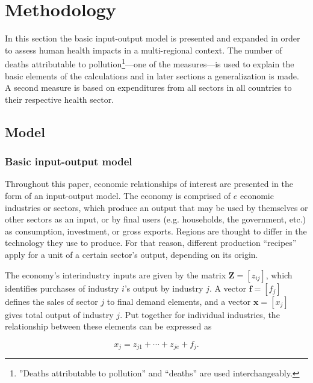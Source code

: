 \documentclass[a4paper,12pt]{article}
\begin{document}


\section{Methodology}
\label{sec:method}

In this section the basic input-output model is presented and expanded in order to assess human health impacts in a multi-regional context. The number of deaths attributable to pollution\footnote{''Deaths attributable to pollution'' and ``deaths'' are used interchangeably.}---one of the measures---is used to explain the basic elements of the calculations and in later sections a generalization is made. 
A second measure is based on expenditures from all sectors in all countries to their respective health sector.

\subsection{Model}
\subsubsection[]{Basic input-output model} 
\label{sec:basicio}

Throughout this paper, economic relationships of interest are presented in the form of an input-output model. The economy is comprised of $e$ economic industries or sectors, which produce an output that may be used by themselves or other sectors as an input, or by final users (e.g. households, the government, etc.) as consumption, investment, or gross exports. Regions are thought to differ in the technology they use to produce. For that reason, different production ``recipes'' apply for a unit of a certain sector's
output, depending on its origin.

The economy's interindustry inputs are given by the matrix $\mathbf{Z}=[z_{ij}]$, which identifies purchases of industry $i$'s output by industry $j$. A vector $\mathbf{f}=[f_j]$ defines the sales of sector $j$ to final demand elements, and a vector $\mathbf{x}=[x_j]$ gives total output of industry $j$. Put together for individual industries, the relationship between these elements can be expressed as

\begin{equation} 
x_j=z_{j1}+\cdots+z_{je}+f_j.
\label{01} 
\end{equation} 
\end{document}

